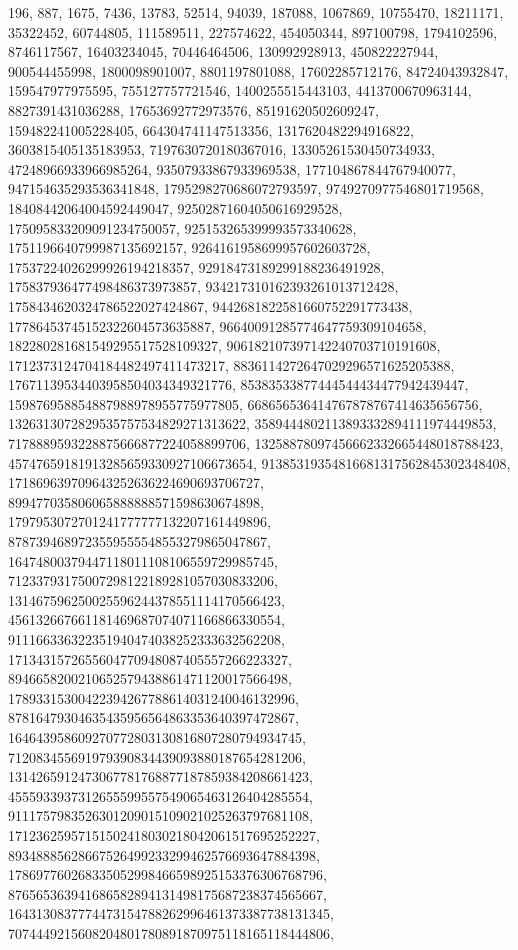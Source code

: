 \documentclass[12pt]{article}
\begin{document}
196, 887, 1675, 7436, 13783, 52514, 94039, 187088, 1067869, 10755470, 
18211171, 35322452, 60744805, 111589511, 227574622, 454050344, 897100798, 
1794102596, 8746117567, 16403234045, 70446464506, 130992928913, 450822227944, 
900544455998, 1800098901007, 8801197801088, 17602285712176, 84724043932847, 
159547977975595, 755127757721546, 1400255515443103, 4413700670963144, 
8827391431036288, 17653692772973576, 85191620502609247, 159482241005228405, 
664304741147513356, 1317620482294916822, 3603815405135183953, 
7197630720180367016, 13305261530450734933, 47248966933966985264, 
93507933867933969538, 177104867844767940077, 947154635293536341848, 
1795298270686072793597, 9749270977546801719568, 18408442064004592449047, 
92502871604050616929528, 175095833209091234750057, 925153265399993573340628, 
1751196640799987135692157, 9264161958699957602603728, 
17537224026299926194218357, 92918473189299188236491928, 
175837936477498486373973857, 934217310162393261013712428, 
1758434620324786522027424867, 9442681822581660752291773438, 
17786453745152322604573635887, 96640091285774647759309104658, 
182280281681549295517528109327, 906182107397142240703710191608, 
1712373124704184482497411473217, 8836114272647029296571625205388, 
17671139534403958504034349321776, 85383533877444544434477942439447, 
159876958854887988978955775977805, 668656536414767878767414635656756, 
1326313072829535757534829271313622, 3589444802113893332894111974449853, 
7178889593228875666877224058899706, 13258878097456662332665448018788423, 
45747659181913285659330927106673654, 91385319354816681317562845302348408, 
171869639709643252636224690693706727, 899477035806065888888571598630674898, 
1797953072701241777777132207161449896, 8787394689723559555548553279865047867, 
16474800379447118011108106559729985745, 
71233793175007298122189281057030833206, 
131467596250025596244378551114170566423, 
456132667661181469687074071166866330554, 
911166336322351940474038252333632562208, 
1713431572655604770948087405557266223327, 
8946658200210652579438861471120017566498, 
17893315300422394267788614031240046132996, 
87816479304635435956564863353640397472867, 
164643958609270772803130816807280794934745, 
712083455691979390834439093880187654281206, 
1314265912473067781768877187859384208661423, 
4555933937312655599557549065463126404285554, 
9111757983526301209015109021025263797681108, 
17123625957151502418030218042061517695252227, 
89348885628667526499233299462576693647884398, 
178697760268335052998466598925153376306768796, 
876565363941686582894131498175687238374565667, 
1643130837774473154788262996461373387738131345, 
7074449215608204801780891870975118165118444806, 
\end{document}
